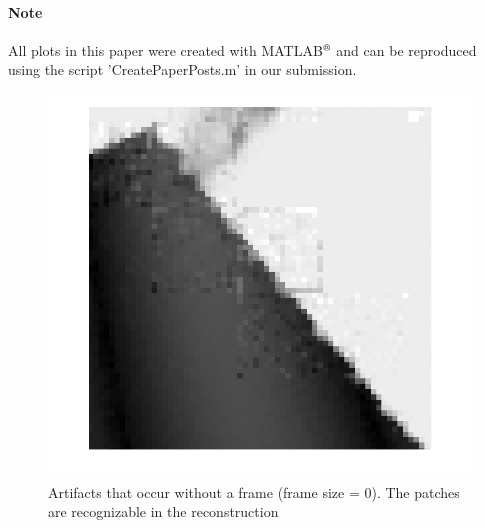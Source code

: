 \documentclass[10pt,conference,compsocconf]{IEEEtran}
\begin{document}
\paragraph{Note}
All plots in this paper were created with MATLAB$\textsuperscript{\textregistered}$ and can be reproduced using the script 'CreatePaperPosts.m' in our submission.\\

\begin{figure}[tbp]
  \centering
  \includegraphics[width=\columnwidth]{images/boundaryArtifact_noframe.png}
  \caption{Artifacts that occur without a frame (frame size = 0). The patches are recognizable in the reconstruction}
  \label{fig:boundaryArtifacts}
\end{figure}
\end{document}
